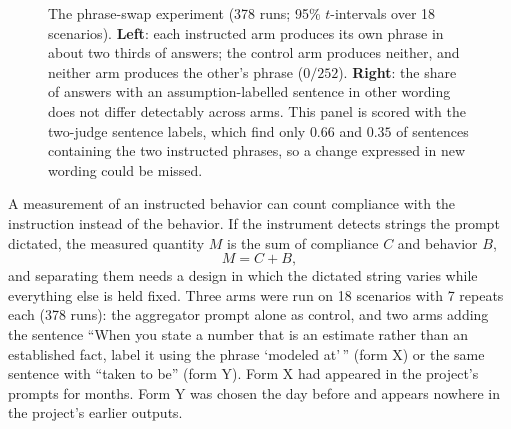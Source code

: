 \documentclass[10pt,twocolumn]{article}
\begin{document}
\begin{figure}[t]
\centering
{}\hfill
{}
\caption{The phrase-swap experiment (378 runs; 95\% $t$-intervals over
18 scenarios). \textbf{Left}: each instructed arm produces its own
phrase in about two thirds of answers; the control arm produces
neither, and neither arm produces the other's phrase ($0/252$).
\textbf{Right}: the share of answers with an assumption-labelled
sentence in other wording does not differ detectably across arms. This
panel is scored with the two-judge sentence labels, which find only
$0.66$ and $0.35$ of sentences containing the two instructed phrases,
so a change expressed in new wording could be missed.}
\label{fig:swap}
\end{figure}

A measurement of an instructed behavior can count compliance with the
instruction instead of the behavior. If the instrument detects strings
the prompt dictated, the measured quantity $M$ is the sum of compliance
$C$ and behavior $B$,
\begin{equation}
M = C + B ,
\label{eq:entangle}
\end{equation}
and separating them needs a design in which the dictated string varies
while everything else is held fixed. Three arms were run on 18
scenarios with 7 repeats each (378 runs): the aggregator prompt alone
as control, and two arms adding the sentence ``When you state a number
that is an estimate rather than an established fact, label it using the
phrase `modeled at'\,'' (form X) or the same sentence with ``taken to
be'' (form Y). Form X had appeared in the project's prompts for months.
Form Y was chosen the day before and appears nowhere in the project's
earlier outputs.
\end{document}
